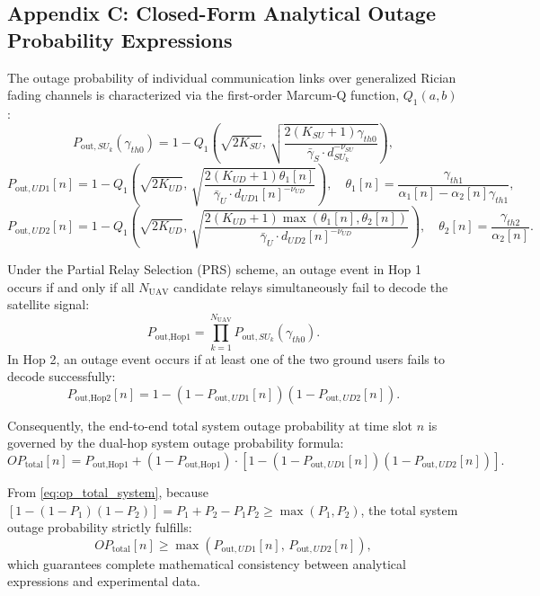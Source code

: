 \subsection*{Appendix C: Closed-Form Analytical Outage Probability Expressions}

The outage probability of individual communication links over generalized Rician fading channels is characterized via the first-order Marcum-Q function, $Q_1(a, b)$ \cite{simon2005digital}:
\begin{equation}
P_{\text{out},SU_k}(\gamma_{th0}) = 1 - Q_1\left( \sqrt{2K_{SU}}, \, \sqrt{\frac{2(K_{SU}+1)\gamma_{th0}}{\bar{\gamma}_S \cdot d_{SU_k}^{-\nu_{SU}}}} \right), \label{eq:pout_suk}
\end{equation}
\begin{equation}
P_{\text{out},UD1}[n] = 1 - Q_1\left( \sqrt{2K_{UD}}, \, \sqrt{\frac{2(K_{UD}+1)\theta_1[n]}{\bar{\gamma}_U \cdot d_{UD1}[n]^{-\nu_{UD}}}} \right), \quad \theta_1[n] = \frac{\gamma_{th1}}{\alpha_1[n] - \alpha_2[n]\gamma_{th1}}, \label{eq:pout_ud1}
\end{equation}
\begin{equation}
P_{\text{out},UD2}[n] = 1 - Q_1\left( \sqrt{2K_{UD}}, \, \sqrt{\frac{2(K_{UD}+1)\max(\theta_1[n], \theta_2[n])}{\bar{\gamma}_U \cdot d_{UD2}[n]^{-\nu_{UD}}}} \right), \quad \theta_2[n] = \frac{\gamma_{th2}}{\alpha_2[n]}. \label{eq:pout_ud2}
\end{equation}

Under the Partial Relay Selection (PRS) scheme, an outage event in Hop 1 occurs if and only if all $N_{\text{UAV}}$ candidate relays simultaneously fail to decode the satellite signal:
\begin{equation}
P_{\text{out,Hop1}} = \prod_{k=1}^{N_{\text{UAV}}} P_{\text{out},SU_k}(\gamma_{th0}).
\end{equation}
In Hop 2, an outage event occurs if at least one of the two ground users fails to decode successfully:
\begin{equation}
P_{\text{out,Hop2}}[n] = 1 - \left( 1 - P_{\text{out},UD1}[n] \right) \left( 1 - P_{\text{out},UD2}[n] \right).
\end{equation}

Consequently, the end-to-end total system outage probability at time slot $n$ is governed by the dual-hop system outage probability formula:
\begin{equation}
OP_{\text{total}}[n] = P_{\text{out,Hop1}} + (1 - P_{\text{out,Hop1}}) \cdot \left[ 1 - \left( 1 - P_{\text{out},UD1}[n] \right) \left( 1 - P_{\text{out},UD2}[n] \right) \right]. \label{eq:op_total_system}
\end{equation}

\noindent
From \eqref{eq:op_total_system}, because $[1 - (1 - P_1)(1 - P_2)] = P_1 + P_2 - P_1 P_2 \ge \max(P_1, P_2)$, the total system outage probability strictly fulfills:
\begin{equation}
OP_{\text{total}}[n] \ge \max\left( P_{\text{out},UD1}[n], \, P_{\text{out},UD2}[n] \right),
\end{equation}
which guarantees complete mathematical consistency between analytical expressions and experimental data.
\par
